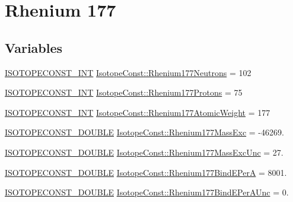 \hypertarget{group___isotope_const-_rhenium-_re177}{}\section{Rhenium 177}
\label{group___isotope_const-_rhenium-_re177}
\subsection*{Variables}
\begin{DoxyCompactItemize}
\item 
\mbox{\hyperlink{group___isotope_const-_macros_ga5f18360b3e99483a35c32d789e62621c}{I\+S\+O\+T\+O\+P\+E\+C\+O\+N\+S\+T\+\_\+\+I\+NT}} \mbox{\hyperlink{group___isotope_const-_rhenium-_re177_gae40c82a92eec45ef91702508d8479a43}{Isotope\+Const\+::\+Rhenium177\+Neutrons}} = 102
\item 
\mbox{\hyperlink{group___isotope_const-_macros_ga5f18360b3e99483a35c32d789e62621c}{I\+S\+O\+T\+O\+P\+E\+C\+O\+N\+S\+T\+\_\+\+I\+NT}} \mbox{\hyperlink{group___isotope_const-_rhenium-_re177_ga3600c9d4a13e6fa1ff501676baf34de5}{Isotope\+Const\+::\+Rhenium177\+Protons}} = 75
\item 
\mbox{\hyperlink{group___isotope_const-_macros_ga5f18360b3e99483a35c32d789e62621c}{I\+S\+O\+T\+O\+P\+E\+C\+O\+N\+S\+T\+\_\+\+I\+NT}} \mbox{\hyperlink{group___isotope_const-_rhenium-_re177_gaebd89e7081f8264dafc57a4dcb7a8db6}{Isotope\+Const\+::\+Rhenium177\+Atomic\+Weight}} = 177
\item 
\mbox{\hyperlink{group___isotope_const-_macros_ga8f45a7272ce02c0b4c65c44636ed719a}{I\+S\+O\+T\+O\+P\+E\+C\+O\+N\+S\+T\+\_\+\+D\+O\+U\+B\+LE}} \mbox{\hyperlink{group___isotope_const-_rhenium-_re177_gabb4aba9c585fae5c81b0e623e39be9aa}{Isotope\+Const\+::\+Rhenium177\+Mass\+Exc}} = -\/46269.
\item 
\mbox{\hyperlink{group___isotope_const-_macros_ga8f45a7272ce02c0b4c65c44636ed719a}{I\+S\+O\+T\+O\+P\+E\+C\+O\+N\+S\+T\+\_\+\+D\+O\+U\+B\+LE}} \mbox{\hyperlink{group___isotope_const-_rhenium-_re177_gad2cd7d27b9075ea3774dae5c0b0429a8}{Isotope\+Const\+::\+Rhenium177\+Mass\+Exc\+Unc}} = 27.
\item 
\mbox{\hyperlink{group___isotope_const-_macros_ga8f45a7272ce02c0b4c65c44636ed719a}{I\+S\+O\+T\+O\+P\+E\+C\+O\+N\+S\+T\+\_\+\+D\+O\+U\+B\+LE}} \mbox{\hyperlink{group___isotope_const-_rhenium-_re177_ga2e8ece70ab272e919fc8eff966e0bec2}{Isotope\+Const\+::\+Rhenium177\+Bind\+E\+PerA}} = 8001.
\item 
\mbox{\hyperlink{group___isotope_const-_macros_ga8f45a7272ce02c0b4c65c44636ed719a}{I\+S\+O\+T\+O\+P\+E\+C\+O\+N\+S\+T\+\_\+\+D\+O\+U\+B\+LE}} \mbox{\hyperlink{group___isotope_const-_rhenium-_re177_gaaa8db4654a2942ef9fe3fdf0880a6825}{Isotope\+Const\+::\+Rhenium177\+Bind\+E\+Per\+A\+Unc}} = 0.

\end{DoxyCompactItemize}
